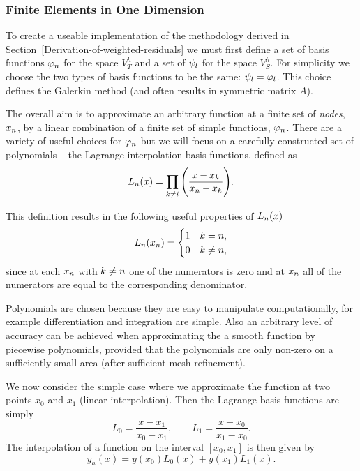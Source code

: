 \subsubsection{Finite Elements in One Dimension}
\label{sub:Actual-Finite-Elements}

To create a useable implementation of the methodology derived in Section~\ref{Derivation-of-weighted-residuals} we must first define a set of basis functions $\varphi_n$ for the space $V_{T}^{h}$ and a set of $\psi_l$ for the space $V_S^h$. For simplicity we choose the two types of basis functions to be the same: $\psi_l = \varphi_l$. This choice defines the Galerkin method (and often results in symmetric matrix $A$).\cite{Zeinkiewicz1967} %


The overall aim is to approximate an arbitrary function at a finite set of \emph{nodes}, $x_n$, by a linear combination of a finite set of simple functions, $\varphi_n$. There are a variety of useful choices for $\varphi_n$ but we will focus on a carefully constructed set of polynomials -- the Lagrange interpolation basis functions, defined as
\begin{equation*}
  L_n(x)=\prod_{k\neq i}\Bigg(\dfrac{x-x_{k}}{x_n-x_{k}}\Bigg).
\end{equation*}

This definition results in the following useful properties of $L_{n}(x)$
\begin{equation}
  \label{eq:35}
  L_{n}(x_{n}) =
  \begin{cases}
    1 & k = n, \\
    0 & k \neq n,
  \end{cases}
\end{equation}
since at each $x_{n}$ with $k \neq n$ one of the numerators is zero and at
$x_{n}$ all of the numerators are equal to the corresponding denominator.

Polynomials are chosen because they are easy to manipulate computationally, for example differentiation and integration are simple. Also an arbitrary level of accuracy can be achieved when approximating the a smooth function by piecewise polynomials, provided that the polynomials are only non-zero on a sufficiently small area (\ie after sufficient mesh refinement).

We now consider the simple case where we approximate the function at two points
$x_{0}$ and $x_{1}$ (linear interpolation). Then the Lagrange basis
functions are simply
\begin{equation}
  L_{0}=\dfrac{x-x_{1}}{x_{0}-x_{1}},\qquad
  L_{1}=\dfrac{x-x_{0}}{x_{1}-x_{0}}.
  \label{eq:simple_lagrange}
\end{equation}
The interpolation of a function on the interval $[x_{0},x_{1}]$ is then given by
\begin{equation*}
  y_{h}(x)=y(x_{0})L_{0}(x)+y(x_{1})L_{1}(x).
\end{equation*}

